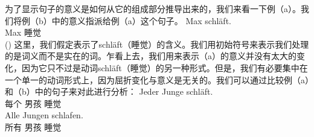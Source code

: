 为了显示句子的意义是如何从它的组成部分推导出来的，我们来看一下例（a）。我们将例（b）中的意义指派给例（a）这个句子。
\eal
\ex\label{Bsp-Max-schlaeft}
\gll Max schläft.\\
     Max 睡觉\\
\ex\label{Bsp-schlafen-max} 
()
\zl
这里，我们假定表示了schläft（睡觉）的含义。我们用初始符号来表示我们处理的是词义而不是实在的词。乍看上去，我们用来表示（a）的意义并没有太大的变化，因为它只不过是动词schläft（睡觉）的另一种形式。但是，我们有必要集中在一个单一的动词形式上，因为屈折变化与意义是无关的。我们可以通过比较例（a）和（b）中的句子来对此进行分析：
\eal
\ex 
\gll Jeder Junge schläft.\\
     每个 男孩 睡觉\\
\ex 
\gll Alle Jungen schlafen.\\
     所有 男孩 睡觉\\
\zl

